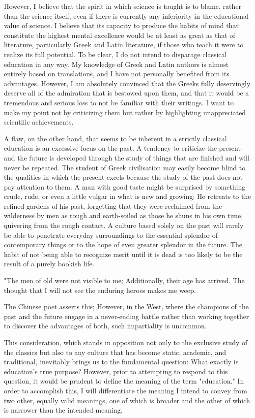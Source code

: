 \documentclass[a4paper,12pt]{book}[2004/02/16]
\theoremstyle{ilemma}
\theoremstyle{itheorem}
\theoremstyle{iother}
\theoremstyle{icorollary}
\theoremstyle{numcorollary}
\theoremstyle{idefinition}
\begin{document}
However, I believe that the spirit in which science is taught is to blame, rather than the science itself, even if there is currently any inferiority in the educational value of science. I believe that its capacity to produce the habits of mind that constitute the highest mental excellence would be at least as great as that of literature, particularly Greek and Latin literature, if those who teach it were to realize its full potential. To be clear, I do not intend to disparage classical education in any way. My knowledge of Greek and Latin authors is almost entirely based on translations, and I have not personally benefited from its advantages. However, I am absolutely convinced that the Greeks fully deservingly deserve all of the admiration that is bestowed upon them, and that it would be a tremendous and serious loss to not be familiar with their writings. I want to make my point not by criticizing them but rather by highlighting unappreciated scientific achievements.

A flaw, on the other hand, that seems to be inherent in a strictly classical education is an excessive focus on the past. A tendency to criticize the present and the future is developed through the study of things that are finished and will never be repeated. The student of Greek civilisation may easily become blind to the qualities in which the present excels because the study of the past does not pay attention to them. A man with good taste might be surprised by something crude, rude, or even a little vulgar in what is new and growing;
He retreats to the refined gardens of his past, forgetting that they were reclaimed from the wilderness by men as rough and earth-soiled as those he shuns in his own time, quivering from the rough contact. A culture based solely on the past will rarely be able to penetrate everyday surroundings to the essential splendor of contemporary things or to the hope of even greater splendor in the future. The habit of not being able to recognize merit until it is dead is too likely to be the result of a purely bookish life.

    "The men of old were not visible to me;
    Additionally, their age has arrived.
    The thought that I will not see the enduring heroes makes me weep.

The Chinese poet asserts this; However, in the West, where the champions of the past and the future engage in a never-ending battle rather than working together to discover the advantages of both, such impartiality is uncommon.

This consideration, which stands in opposition not only to the exclusive study of the classics but also to any culture that has become static, academic, and traditional, inevitably brings us to the fundamental question: What exactly is education's true purpose? However, prior to attempting to respond to this question, it would be prudent to define the meaning of the term "education." In order to accomplish this, I will differentiate the meaning I intend to convey from two other, equally valid meanings, one of which is broader and the other of which is narrower than the intended meaning.
\end{document}
